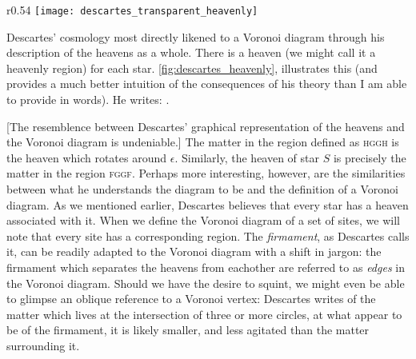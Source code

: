 \documentclass[12pt,twoside]{reedthesis}
\begin{document}

    \begin{wrapfigure}{r}{0.54\textwidth}
      \centering
      \texttt{[image: descartes\_transparent\_heavenly]}
      \caption{Descartes' Heavenly Regions}
      \label{fig:descartes_heavenly}
    \end{wrapfigure}


   Descartes' cosmology most directly likened to a Voronoi diagram through his description of the heavens as a whole. There is a heaven (we might call it a heavenly region) for each star. \cref{fig:descartes_heavenly}, illustrates this (and provides a much better intuition of the consequences of his theory than I am able to provide in words). He writes: \citep[][p. 35]{descartes}.\par

   [The resemblence between Descartes' graphical representation of the heavens and the Voronoi diagram is undeniable.] The matter in the region defined as \textsc{hggh} is the heaven which rotates around $\epsilon$. Similarly, the heaven of star $S$ is precisely the matter in the region \textsc{fggf}. Perhaps more interesting, however, are the similarities between what he understands the diagram to be and the definition of a Voronoi diagram. As we mentioned earlier, Descartes believes that every star has a heaven associated with it. When we define the Voronoi diagram of a set of sites, we will note that every site has a corresponding region. The \emph{firmament}, as Descartes calls it, can be readily adapted to the Voronoi diagram with a shift in jargon: the firmament which separates the heavens from eachother are referred to as \emph{edges} in the Voronoi diagram. Should we have the desire to squint, we might even be able to glimpse an oblique reference to a Voronoi vertex: Descartes writes of the matter which lives at the intersection of three or more circles, at what appear to be  of the firmament, it is likely smaller, and less agitated than the matter surrounding it.  
  
\end{document}
